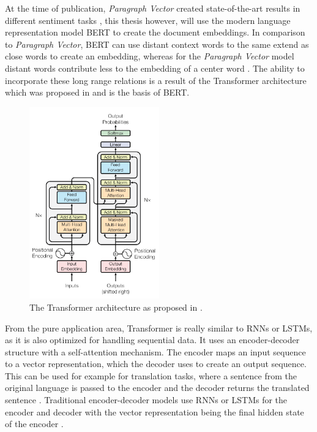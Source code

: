 At the time of publication, \textit{Paragraph Vector} created state-of-the-art results in different sentiment tasks \cite[pp. 4-7]{Mikolov2014}, this thesis however, will use the modern language representation model \ac{BERT} to create the document embeddings.
In comparison to \textit{Paragraph Vector}, \ac{BERT} can use distant context words to the same extend as close words to create an embedding, whereas for the \textit{Paragraph Vector} model distant words contribute less to the embedding of a center word \cite[p. 4]{Mikolov2013}.
The ability to incorporate these long range relations is a result of the Transformer architecture which was proposed in \cite{Vaswani2017} and is the basis of \ac{BERT}.
\begin{figure}[h]
    \centering
    \includegraphics[width=0.5\textwidth]{figures/transformer_architecture.png}
    \caption{The Transformer architecture as proposed in \cite[p. 3]{Vaswani2017}.}
    \label{figure:transformer_architecture}
\end{figure}
From the pure application area, Transformer is really similar to \acp{RNN} or \acp{LSTM}, as it is also optimized for handling sequential data.
It uses an encoder-decoder structure with a self-attention mechanism.
The encoder maps an input sequence to a vector representation, which the decoder uses to create an output sequence.
This can be used for example for translation tasks, where a sentence from the original language is passed to the encoder and the decoder returns the translated sentence \cite[p. 392]{Goodfellow2016}.
Traditional encoder-decoder models use \acp{RNN} or \acp{LSTM} for the encoder and decoder with the vector representation being the final hidden state of the encoder \cite[p. 392]{Goodfellow2016}.
